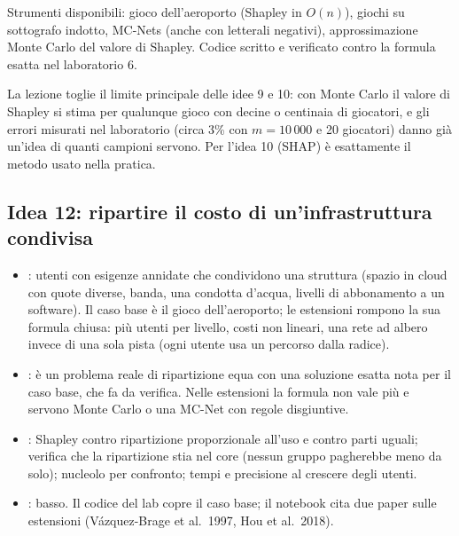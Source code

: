 \documentclass[11pt, a4paper, oneside, openany]{book}
\newcommand{\stato}[2]{\etichetta{#1}{#2}}
\newcommand{\sbloccata}[1]{\stato{blu}{DA LEZIONE #1}}
\begin{document}
Strumenti disponibili: gioco dell'aeroporto (Shapley in $O(n)$), giochi su sottografo
indotto, MC-Nets (anche con letterali negativi), approssimazione Monte Carlo del valore di
Shapley. Codice scritto e verificato contro la formula esatta nel laboratorio 6.

\begin{osservazione}
La lezione toglie il limite principale delle idee 9 e 10: con Monte Carlo il valore di
Shapley si stima per qualunque gioco con decine o centinaia di giocatori, e gli errori
misurati nel laboratorio (circa 3\% con $m = 10\,000$ e 20 giocatori) danno già un'idea di
quanti campioni servono. Per l'idea 10 (SHAP) è esattamente il metodo usato nella pratica.
\end{osservazione}

\subsection*{Idea 12: ripartire il costo di un'infrastruttura condivisa \hfill\sbloccata{6}}
\begin{itemize}
  \item {}: utenti con esigenze annidate che condividono una struttura (spazio in
        cloud con quote diverse, banda, una condotta d'acqua, livelli di abbonamento a un
        software). Il caso base è il gioco dell'aeroporto; le estensioni rompono la sua
        formula chiusa: più utenti per livello, costi non lineari, una rete ad albero
        invece di una sola pista (ogni utente usa un percorso dalla radice).
  \item {}: è un problema reale di ripartizione equa con una
        soluzione esatta nota per il caso base, che fa da verifica. Nelle estensioni la
        formula non vale più e servono Monte Carlo o una MC-Net con regole disgiuntive.
  \item {}: Shapley contro ripartizione proporzionale all'uso e contro parti
        uguali; verifica che la ripartizione stia nel core (nessun gruppo pagherebbe meno
        da solo); nucleolo per confronto; tempi e precisione al crescere degli utenti.
  \item {}: basso. Il codice del lab copre il caso base; il notebook cita due
        paper sulle estensioni (Vázquez-Brage et al.\ 1997, Hou et al.\ 2018).
\end{itemize}
\end{document}
